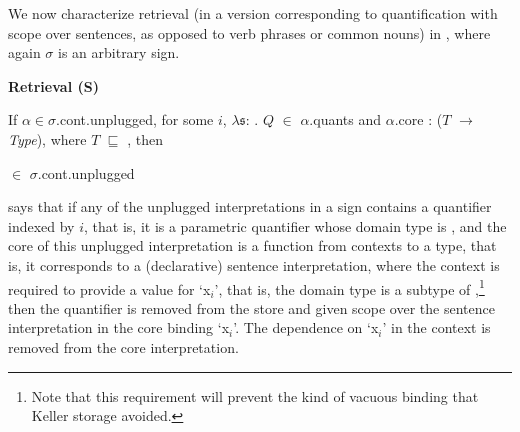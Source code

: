 We now characterize retrieval (in a version corresponding to
quantification with scope over sentences, as opposed to verb phrases
or common nouns) in \nexteg{}, where again $\sigma$ is an arbitrary
sign.
\begin{ex} 
\textbf{Retrieval (S)} 

If $\alpha\in\sigma$.cont.unplugged, for some $i$,
$\lambda\mathfrak{s}$:
. $Q$ $\in$ $\alpha$.quants and $\alpha$.core : ($T$ $\rightarrow$
\textit{Type}), where $T$ $\sqsubseteq$
, then \\

\hspace*{1em}

\hspace*{4em}$\in$ $\sigma$.cont.unplugged
\end{ex} 
\preveg{} says that if any of the unplugged interpretations in a sign
contains a quantifier indexed by $i$, that is, it is a parametric
quantifier whose domain type is
, and the core of this
unplugged interpretation is a function from contexts to a type, that
is, it corresponds to a (declarative) sentence interpretation, where
the context is required to provide a value for `x$_i$', that is, the
domain type is a subtype of
,\footnote{Note that
  this requirement will prevent the kind of vacuous binding that
  Keller storage \citep{Keller1988} avoided.} then the quantifier is
removed from the store and given scope over the sentence
interpretation in the core binding `x$_i$'.  The dependence on `x$_i$'
in the context is removed from the core interpretation. 


